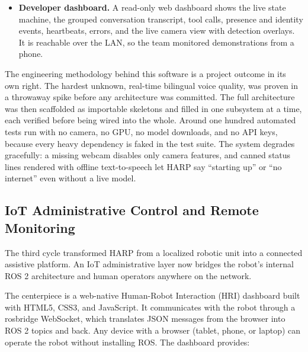 \documentclass[11pt,a4paper]{article}
\begin{document}
\begin{itemize}
\item \textbf{Developer dashboard.} A read-only web dashboard shows the live state machine, the grouped conversation transcript, tool calls, presence and identity events, heartbeats, errors, and the live camera view with detection overlays. It is reachable over the LAN, so the team monitored demonstrations from a phone.
\end{itemize}

The engineering methodology behind this software is a project outcome in its own right. The hardest unknown, real-time bilingual voice quality, was proven in a throwaway spike before any architecture was committed. The full architecture was then scaffolded as importable skeletons and filled in one subsystem at a time, each verified before being wired into the whole. Around one hundred automated tests run with no camera, no GPU, no model downloads, and no API keys, because every heavy dependency is faked in the test suite. The system degrades gracefully: a missing webcam disables only camera features, and canned status lines rendered with offline text-to-speech let HARP say ``starting up'' or ``no internet'' even without a live model.

\subsection{IoT Administrative Control and Remote Monitoring}

The third cycle transformed HARP from a localized robotic unit into a connected assistive platform. An IoT administrative layer now bridges the robot's internal ROS 2 architecture and human operators anywhere on the network.

The centerpiece is a web-native Human-Robot Interaction (HRI) dashboard built with HTML5, CSS3, and JavaScript. It communicates with the robot through a rosbridge WebSocket, which translates JSON messages from the browser into ROS 2 topics and back. Any device with a browser (tablet, phone, or laptop) can operate the robot without installing ROS. The dashboard provides:
\end{document}
